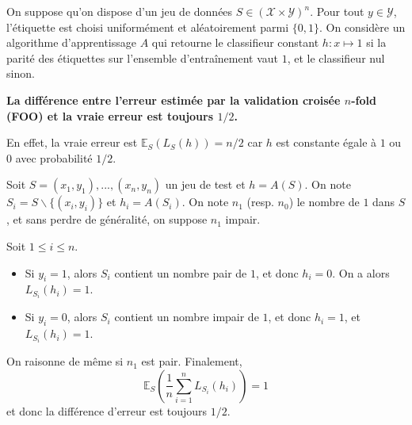 On suppose qu'on dispose d'un jeu de données $S\in (\mathcal{X} \times \mathcal{Y})^n$. Pour tout $y\in \mathcal{Y}$, l'étiquette est choisi uniformément et aléatoirement parmi $\{0,1\}$.  On considère un algorithme d'apprentissage $A$ qui retourne le classifieur constant $h : x\mapsto 1$ si la parité des étiquettes sur l'ensemble d'entraînement vaut $1$, et le classifieur nul sinon. 

\textbf{La différence entre l'erreur estimée par la validation croisée $n$-fold (FOO) et la vraie erreur est toujours $1/2$.}

En effet, la vraie erreur est $\mathbb{E}_S(L_S(h))=n/2$ car $h$ est constante égale à $1$ ou $0$ avec probabilité $1/2$.

Soit $S=(x_1,y_1),...,(x_n,y_n)$ un jeu de test et $h=A(S)$. On note $S_i =S \backslash \{(x_i,y_i)\}$ et $h_i=A(S_i)$. On note $n_1$ (resp. $n_0$) le nombre de $1$ dans $S$, et sans perdre de généralité, on suppose $n_1$ impair. 

Soit $1\leq i \leq n$. 
\begin{itemize}
\item Si $y_i=1$, alors $S_i$ contient un nombre pair de $1$, et donc $h_i=0$. On a alors $L_{S_i}(h_i)=1$.
\item Si $y_i=0$, alors $S_i$ contient un nombre impair de $1$, et donc $h_i=1$, et $L_{S_i}(h_i)=1$.
\end{itemize} 

On raisonne de même si $n_1$ est pair. Finalement, 
$$
\mathbb{E}_S\left( \frac{1}{n} \sum_{i=1}^n L_{S_i}(h_i)\right)=1
$$
et donc la différence d'erreur est toujours $1/2$.
